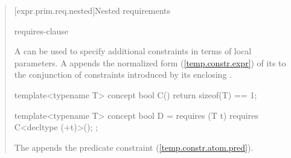 \begin{quote}
[expr.prim.req.nested]{Nested requirements}

\begin{bnf}
\br
    requires-clause \terminal{;}
  \end{bnf}

\pnum
A  can be used
to specify additional constraints in terms of local parameters.
%
A  appends the normalized form 
(\ref{temp.constr.expr}) of its  
to the conjunction of constraints introduced by its enclosing
.

\enterexample
\begin{codeblock}
template<typename T> concept bool C() { return sizeof(T) == 1; }

template<typename T> concept bool D =
  requires (T t) {
    requires C<decltype (+t)>();
  };
\end{codeblock}
The  appends the predicate constraint 
 (\ref{temp.constr.atom.pred}).
\exitexample

\end{quote}